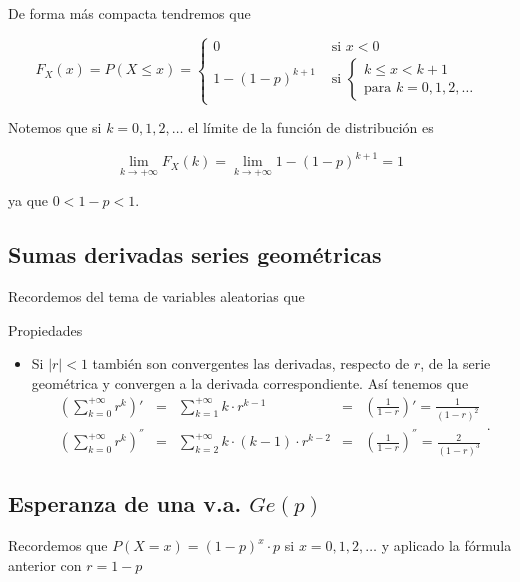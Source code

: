 \documentclass[]{book}
\providecommand{\tightlist}{%
  \setlength{\itemsep}{0pt}\setlength{\parskip}{0pt}}
\begin{document}
De forma más compacta tendremos que

\[
F_X(x)=P(X\leq x)=
\left\{\begin{array}{ll} 
0 & \mbox{ si } x<0\\
1- (1-p)^{k+1} & \mbox{ si } \left\{ \begin{array}{l}k\leq x< k+1\\\mbox{para } k=0,1,2,\ldots\end{array}
    \right.\end{array}
    \right.
\]

Notemos que si \(k=0,1,2,\ldots\) el límite de la función de distribución es

\[
\displaystyle\lim_{k\to +\infty } F_X(k)=\lim_{k\to +\infty } 1-(1-p)^{k+1}=
1
\]

ya que \(0<1-p<1\).

\hypertarget{sumas-derivadas-series-geomuxe9tricas}{%
\subsection{Sumas derivadas series geométricas}\label{sumas-derivadas-series-geomuxe9tricas}}

Recordemos del tema de variables aleatorias que

Propiedades

\begin{itemize}
\tightlist
\item
  Si \(|r|<1\) también son convergentes las derivadas, respecto de \(r\), de la serie geométrica y convergen a la derivada correspondiente. Así tenemos que
  \[
  \begin{eqnarray*}
  \left(\sum_{k=0}^{+\infty} r^k\right)'&= & \sum_{k=1}^{+\infty}k\cdot
  r^{k-1} &=& \left(\frac1{1-r}\right)'=\frac1{(1-r)^2}\\
  \left(\sum_{k=0}^{+\infty} r^k\right)^{''}&=& \sum_{k=2}^{+\infty}k \cdot(k-1)\cdot
  r^{k-2}&=&\left(\frac1{1-r}\right)^{''}=\frac2{(1-r)^3}
  \end{eqnarray*}.
  \]
\end{itemize}

\hypertarget{esperanza-de-una-v.a.-gep}{%
\subsection{\texorpdfstring{Esperanza de una v.a. \(Ge(p)\)}{Esperanza de una v.a. Ge(p)}}\label{esperanza-de-una-v.a.-gep}}

Recordemos que \(P(X=x)=(1-p)^x\cdot p\) si \(x=0,1,2,\ldots\) y aplicado la fórmula anterior con \(r=1-p\)
\end{document}
